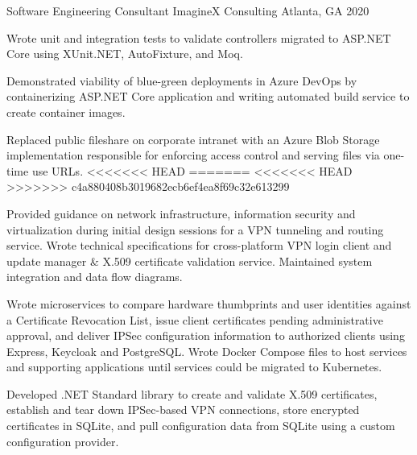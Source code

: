 

\begin{cventries}

  \cventry
    {Software Engineering Consultant} %
    {ImagineX Consulting} %
    {Atlanta, GA} %
    {2020} %
    {
      \begin{cvitems} %
        \item {Wrote unit and integration tests to validate controllers migrated to ASP.NET Core using XUnit.NET, AutoFixture, and Moq.}
        \item {Demonstrated viability of blue-green deployments in Azure DevOps by containerizing ASP.NET Core application and writing automated build service to create container images.}
        \item {Replaced public fileshare on corporate intranet with an Azure Blob Storage implementation responsible for enforcing access control and serving files via one-time use URLs.}
<<<<<<< HEAD
=======
<<<<<<< HEAD
>>>>>>> c4a880408b3019682ecb6ef4ea8f69c32e613299
        \item {Provided guidance on network infrastructure, information security and virtualization during initial design sessions for a VPN tunneling and routing service. Wrote technical specifications for cross-platform VPN login client and update manager \& X.509 certificate validation service. Maintained system integration and data flow diagrams.}
        \item {Wrote microservices to compare hardware thumbprints and user identities against a Certificate Revocation List, issue client certificates pending administrative approval, and deliver IPSec configuration information to authorized clients using Express, Keycloak and PostgreSQL. Wrote Docker Compose files to host services and supporting applications until services could be migrated to Kubernetes.}
        \item {Developed .NET Standard library to create and validate X.509 certificates, establish and tear down IPSec-based VPN connections, store encrypted certificates in SQLite, and pull configuration data from SQLite using a custom configuration provider.}

\end{cvitems}}
\end{cventries}
